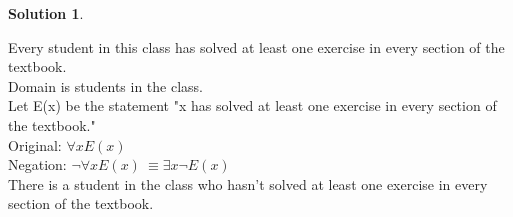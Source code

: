 \documentclass{article}
\theoremstyle{definition}
\newtheorem*{solution}{Solution}
\begin{document}
\begin{solution}
\begin{compactenum}
\item  Every student in this class has solved at least one exercise in every section of the textbook.\ \\
Domain is students in the class.\ \\
Let E(x) be the statement "x has solved at least one exercise in every section of the textbook."\ \\
Original: $\forall x E(x)$\ \\
Negation: $\neg \forall x E(x) \ \equiv \exists x \neg E(x) $\ \\
There is a student in the class who hasn't solved at least one exercise in every section of the textbook.\ \\

\end{compactenum}
\end{solution}
\end{document}
